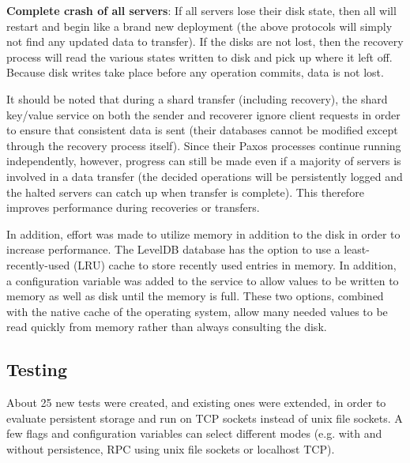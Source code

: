 \documentclass[letterpaper,10pt]{article}
\begin{document}

\textbf{Complete crash of all servers}: If all servers lose their disk state, then all will restart and begin like a brand new deployment (the above protocols will simply not find any updated data to transfer). If the disks are not lost, then the recovery process will read the various states written to disk and pick up where it left off.  Because disk writes take place before any operation commits, data is not lost.

It should be noted that during a shard transfer (including recovery), the shard key/value service on both the sender and recoverer ignore client requests in order to ensure that consistent data is sent (their databases cannot be modified except through the recovery process itself).  Since their Paxos processes continue running independently, however, progress can still be made even if a majority of servers is involved in a data transfer (the decided operations will be persistently logged and the halted servers can catch up when transfer is complete).  This therefore improves performance during recoveries or transfers.

In addition, effort was made to utilize memory in addition to the
disk in order to increase performance.  The LevelDB database has
the option to use a least-recently-used (LRU) cache to store
recently used entries in memory.  In addition, a configuration
variable was added to the service to allow values to be written to
memory as well as disk until the memory is full.  These two
options, combined with the native cache of the operating system,
allow many needed values to be read quickly from memory rather than
always consulting the disk.

\subsection{Testing}
About 25 new tests were created, and existing ones were extended, in order to evaluate persistent storage and run on TCP sockets instead of unix file sockets.  A few flags and configuration variables can select different modes (e.g. with and without persistence, RPC using unix file sockets or localhost TCP).
\end{document}
